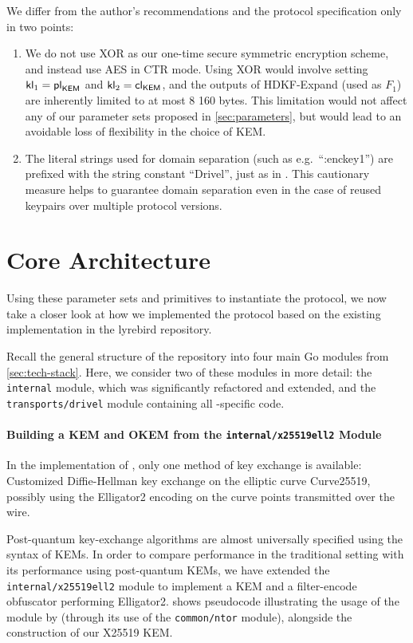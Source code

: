 We differ from the author's recommendations and the protocol specification only in two points:
\begin{enumerate}
    \item We do not use XOR as our one-time secure symmetric encryption scheme, and instead use AES in CTR mode. Using XOR would involve setting $\mathsf{kl}_1 = {\mathsf{pl}_{\mathsf{KEM}}}$ and $\mathsf{kl}_2 = {\mathsf{cl}_{\mathsf{KEM}}}$, and the outputs of \textsf{HDKF-Expand} (used as $F_1$) are inherently limited to at most 8 160 bytes. This limitation would not affect any of our parameter sets proposed in \cref{sec:parameters}, but would lead to an avoidable loss of flexibility in the choice of KEM.

    \item The literal strings used for domain separation (such as e.g.~``:enckey1'') are prefixed with the string constant ``Drivel'', just as in \obfsfour{}. This cautionary measure helps to guarantee domain separation even in the case of reused keypairs over multiple protocol versions.
\end{enumerate}

\section{Core Architecture} \label{sec:impl-architecture}

Using these parameter sets and primitives to instantiate the \drivel{} protocol, we now take a closer look at how we implemented the \drivel{} protocol based on the existing \obfsfour{} implementation in the lyrebird repository.

Recall the general structure of the repository into four main Go modules from \cref{sec:tech-stack}. Here, we consider two of these modules in more detail: the \texttt{internal} module, which was significantly refactored and extended, and the \texttt{transports/drivel} module containing all \drivel{}-specific code.

\paragraph{Building a KEM and OKEM from the \texttt{internal/x25519ell2} Module}

In the implementation of \obfsfour{}, only one method of key exchange is available: Customized Diffie-Hellman key exchange on the elliptic curve Curve25519, possibly using the \textsf{Elligator2} encoding on the curve points transmitted over the wire.

Post-quantum key-exchange algorithms are almost universally specified using the syntax of KEMs. In order to compare \drivel{} performance in the traditional setting with its performance using post-quantum KEMs, we have extended the \texttt{internal/x25519ell2} module to implement a KEM and a filter-encode obfuscator performing \textsf{Elligator2}.  shows pseudocode illustrating the usage of the module by \obfsfour{} (through its use of the \texttt{common/ntor} module), alongside the construction of our X25519 KEM.

